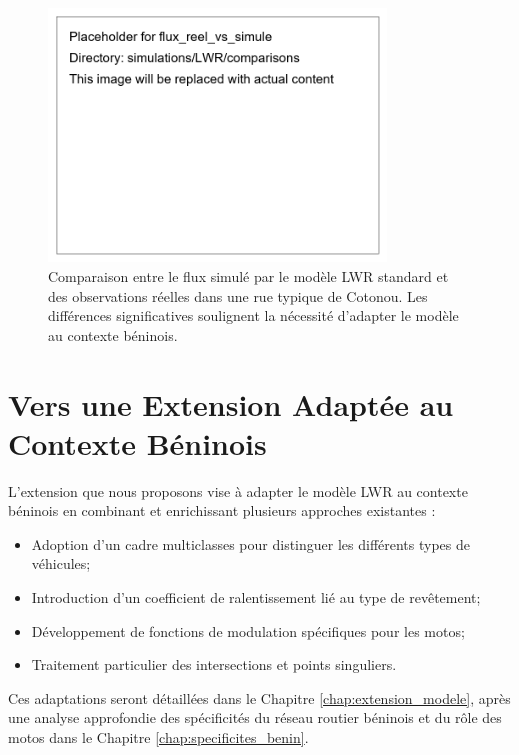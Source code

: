 \begin{figure}[htbp]
\centering
\includegraphics[width=0.8\textwidth]{simulations/LWR/comparisons/flux_reel_vs_simule}
\caption{Comparaison entre le flux simulé par le modèle LWR standard et des observations réelles dans une rue typique de Cotonou. Les différences significatives soulignent la nécessité d'adapter le modèle au contexte béninois.}
\label{fig:comparaison_flux}
\end{figure}

\section{Vers une Extension Adaptée au Contexte Béninois}
\label{sec:vers_extension}

L'extension que nous proposons vise à adapter le modèle LWR au contexte béninois en combinant et enrichissant plusieurs approches existantes :

\begin{itemize}
\item Adoption d'un cadre multiclasses pour distinguer les différents types de véhicules;
\item Introduction d'un coefficient de ralentissement lié au type de revêtement;
\item Développement de fonctions de modulation spécifiques pour les motos;
\item Traitement particulier des intersections et points singuliers.
\end{itemize}

Ces adaptations seront détaillées dans le Chapitre \ref{chap:extension_modele}, après une analyse approfondie des spécificités du réseau routier béninois et du rôle des motos dans le Chapitre \ref{chap:specificites_benin}.
